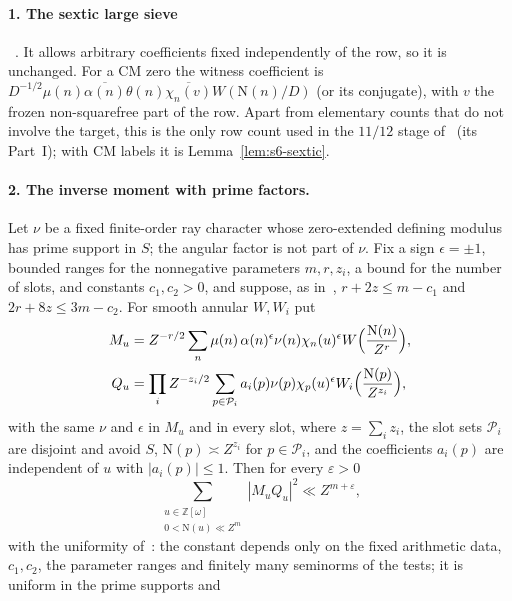 \documentclass[11pt]{article}
\numberwithin{equation}{section}
\newcommand{\OO}{\mathbb Z[\omega]}
\newcommand{\N}{\mathrm N}
\begin{document}
\paragraph{1. The sextic large sieve}~\cite[Lemma~9.1]{OAI78}.
It allows arbitrary coefficients fixed independently of the row, so it is unchanged. For a CM zero the witness
coefficient is $D^{-1/2}\mu(n)\overline{\alpha(n)}\theta(n)\overline{\chi_n(v)}W(\N(n)/D)$ (or its conjugate), with $v$
the frozen non-squarefree part of the row. Apart from elementary counts that do not involve the target, this is the
only row count used in the $11/12$ stage of~\cite{OAI78} (its Part~I); with CM labels it is
Lemma~\ref{lem:s6-sextic}.

\paragraph{2. The inverse moment with prime factors.} Let $\nu$ be a fixed finite-order ray character whose
zero-extended defining modulus has prime support in $S$; the angular factor is not part of $\nu$. Fix a sign
$\epsilon=\pm1$, bounded ranges for the nonnegative parameters $m,r,z_i$, a bound for the number of slots, and
constants $c_1,c_2>0$, and suppose, as in~\cite[Lemma~17.1]{OAI78}, $r+2z\le m-c_1$ and $2r+8z\le3m-c_2$.
For smooth annular $W,W_i$ put
\begin{equation}\label{eq:d199}\begin{aligned}
 M_u&=Z^{-r/2}\sum_n\mu(n)\,\alpha(n)^{\epsilon}\nu(n)\chi_n(u)^{\epsilon}
 W\Bigl(\frac{\N(n)}{Z^r}\Bigr),\\
 Q_u&=\prod_{i}Z^{-z_i/2}\sum_{p\in\mathcal P_i}a_i(p)\nu(p)\chi_p(u)^{\epsilon}W_i\Bigl(\frac{\N(p)}{Z^{z_i}}\Bigr),
\end{aligned}\end{equation}
with the same $\nu$ and $\epsilon$ in $M_u$ and in every slot, where $z=\sum_iz_i$, the slot sets $\mathcal P_i$ are
disjoint and avoid $S$, $\N(p)\asymp Z^{z_i}$ for $p\in\mathcal P_i$, and the coefficients $a_i(p)$ are independent
of $u$ with $|a_i(p)|\le1$. Then for every $\varepsilon>0$
\begin{equation}\label{eq:cm-inverse}
 \sum_{\substack{u\in\OO\\0<\N(u)\ll Z^m}}|M_uQ_u|^2\ll Z^{m+\varepsilon},
\end{equation}
with the uniformity of~\cite[Lemma~17.1]{OAI78}: the constant depends only on the fixed arithmetic data,
$c_1,c_2$, the parameter ranges and finitely many seminorms of the tests; it is uniform in the prime supports and
\end{document}
